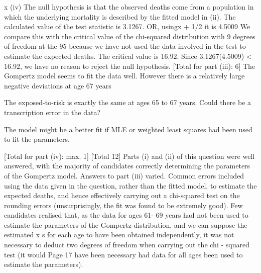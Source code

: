 \documentclass[a4paper,12pt]{article}
\begin{document}
x
(iv)
The null hypothesis is that the observed deaths come from a population
in which the underlying mortality is described by the fitted model in (ii). 
The calculated value of the test statistic is 3.1267.
OR,
using\mu x + 1/2 it is 4.5009 
We compare this with the critical value of the chi-squared distribution
with 9 degrees of freedom at the 95%
because we have not used the data involved in the test
to estimate the expected deaths. 
The critical value is 16.92. 
Since 3.1267(4.5009) < 16.92, 
we have no reason to reject the null hypothesis. 
[Total for part (iii): 6]
The Gompertz model seems to fit the data well. 
However there is a relatively large negative deviations at age 67 years

The exposed-to-risk is exactly the same at ages 65 to 67 years.
Could there be a transcription error in the data?

The model might be a better fit if MLE or weighted least squares had
been used to fit the parameters.

[Total for part (iv): max. 1]
[Total 12]
Parts (i) and (ii) of this question were well answered, with the majority
of candidates correctly determining the parameters of the Gompertz
model. Answers to part (iii) varied. Common errors included using the
data given in the question, rather than the fitted model, to estimate the
expected deaths, and hence effectively carrying out a chi-squared test
on the rounding errors (unsurprisingly, the fit was found to be
extremely good). Few candidates realised that, as the data for ages 61-
69 years had not been used to estimate the parameters of the Gompertz
distribution, and we can suppose the estimated \mu x s for each age to have
been obtained independently, it was not necessary to deduct two
degrees of freedom when carrying out the chi - squared test (it would
Page 17
have been necessary had data for all ages been used to estimate the
parameters).
\end{document}

